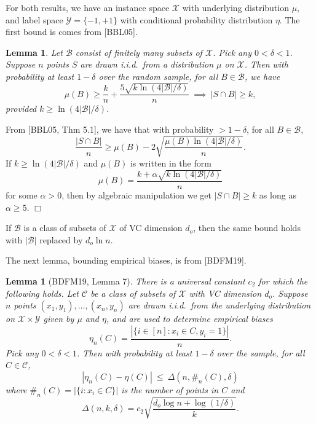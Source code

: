 \documentclass{article}
\def\X{{\mathcal X}}
\def\Y{{\mathcal Y}}
\def\B{{\mathcal B}}
\newtheorem{lemma}[thm]{Lemma}
\newenvironment{proof}{\noindent {\sc Proof:}}{$\Box$ \medskip}
\begin{document}
For both results, we have an instance space $\X$ with underlying distribution $\mu$, and label space $\Y = \{-1,+1\}$ with conditional probability distribution $\eta$.
The first bound is comes from [BBL05].
\begin{lemma}
Let $\B$ consist of finitely many subsets of $\X$. Pick any $0 < \delta < 1$. Suppose $n$ points $S$ are drawn i.i.d.\ from a distribution $\mu$ on $\X$. Then with probability at least $1-\delta$ over the random sample, for all $B \in \B$, we have
$$ \mu(B) \geq \frac{k}{n} + \frac{5 \sqrt{k \ln (4|\B|/\delta)}}{n} \ \implies \ |S \cap B| \geq k,$$
provided $k \geq \ln (4|\B|/\delta)$.
\label{lemma:points-in-balls-finite}
\end{lemma}
\begin{proof}
From [BBL05, Thm 5.1], we have that with probability $> 1-\delta$, for all $B \in \B$, 
$$ \frac{|S \cap B|}{n} \geq \mu(B) - 2 \sqrt{\frac{\mu(B) \ln (4|\B|/\delta)}{n}} .$$ 
If $k \geq \ln (4|\B|/\delta)$ and $\mu(B)$ is written in the form
$$ \mu(B) = \frac{k + \alpha\sqrt{k \ln (4|\B|/\delta)}}{n} $$
for some $\alpha > 0$, then by algebraic manipulation we get $|S \cap B| \geq k$ as long as $\alpha \geq 5$.
\end{proof}

If $\B$ is a class of subsets of $\X$ of VC dimension $d_o$, then the same bound holds with $|\B|$ replaced by $d_o \ln n$.

\iffalse
Here is a weaker bound that is a bit cleaner.
\begin{lemma}[CD10, Lemma 7]
There is a universal constant $c_1$ such that the following holds. Let $\B$ be a class of measurable subsets of $\X$ of VC dimension $d_o$. Pick any $0 < \delta < 1$. Then with probability at least $1-\delta$, if a set of $n$ points $S$ is drawn i.i.d.\ from $\mu$, then for any integer $k$,
$$ \mu(B) \geq \frac{k}{n} + \frac{c_1}{n} \max \left( k, d_o \log \frac{n}{\delta} \right)
\ \implies \ 
|S \cap B| \geq k.$$ 
\label{lemma:points-in-balls-vc}
\end{lemma}
\fi

The next lemma, bounding empirical biases, is from [BDFM19].
\begin{lemma}[BDFM19, Lemma 7]
There is a universal constant $c_2$ for which the following holds. Let $\mathcal{C}$ be a class of subsets of $\X$ with VC dimension $d_o$. Suppose $n$ points $(x_1, y_1), \ldots, (x_n, y_n)$ are drawn i.i.d.\ from the underlying distribution on $\X \times \Y$ given by $\mu$ and $\eta$, and are used to determine empirical biases
$$ \eta_n(C) = \frac{|\{i \in [n]: x_i \in C, y_i = 1\}|}{n}.$$
Pick any $0 < \delta < 1$. Then with probability at least $1-\delta$ over the sample, for all $C \in \mathcal{C}$,
$$ \left| \eta_n(C) - \eta(C) \right| \ \leq \ \Delta(n, \#_n(C), \delta) $$
where $\#_n(C) = |\{i: x_i \in C\}|$ is the number of points in $C$ and 
\begin{equation}
\Delta(n,k,\delta) = c_2 \sqrt{\frac{d_o \log n + \log (1/\delta)}{k}} .
\label{eq:delta-defn}
\end{equation}
\label{lemma:bias}
\end{lemma}
\end{document}
